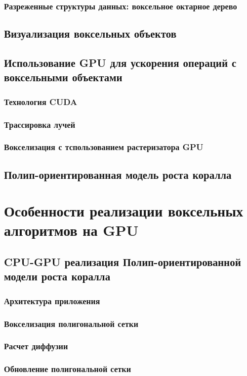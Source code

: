 \documentclass[a4paper,14pt]{extreport}
\begin{document}
\subsection{Разреженные структуры данных: воксельное октарное дерево}
\section{Визуализация воксельных объектов}
\section{Использование GPU для ускорения операций с воксельными объектами}
\subsection{Технология CUDA}
\subsection{Трассировка лучей}
\subsection{Вокселизация с тспользованием растеризатора GPU}
\section{Полип-ориентированная модель роста коралла}

\chapter{Особенности реализации воксельных алгоритмов на GPU}
\section{CPU-GPU реализация Полип-ориентированной модели роста коралла}
\subsection{Архитектура приложения}
\subsection{Вокселизация полигональной сетки}
\subsection{Расчет диффузии}
\subsection{Обновление полигональной сетки}
\end{document}
